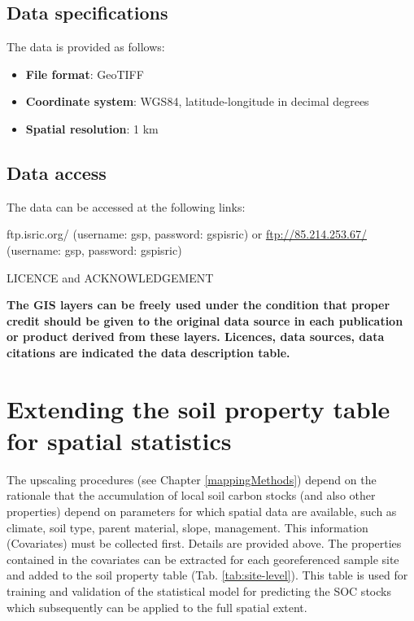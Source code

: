 \documentclass[10pt,b5paper,]{book}
\providecommand{\tightlist}{%
  \setlength{\itemsep}{0pt}\setlength{\parskip}{0pt}}
\theoremstyle{definition}
\theoremstyle{definition}
\theoremstyle{definition}
\theoremstyle{remark}
\begin{document}
\hypertarget{data-specifications}{%
\subsection{Data specifications}\label{data-specifications}}

The data is provided as follows:

\begin{itemize}
\tightlist
\item
  \textbf{File format}: GeoTIFF
\item
  \textbf{Coordinate system}: WGS84, latitude-longitude in decimal
  degrees
\item
  \textbf{Spatial resolution}: 1 km
\end{itemize}

\hypertarget{data-access}{%
\subsection{Data access}\label{data-access}}

The data can be accessed at the following links:

ftp.isric.org/ (username: gsp, password: gspisric) or
\url{ftp://85.214.253.67/} (username: gsp, password: gspisric)

LICENCE and ACKNOWLEDGEMENT

\textbf{The GIS layers can be freely used under the condition that
proper credit should be given to the original data source in each
publication or product derived from these layers. Licences, data
sources, data citations are indicated the data description table.}

\hypertarget{extending-the-soil-property-table-for-spatial-statistics}{%
\section{Extending the soil property table for spatial
statistics}\label{extending-the-soil-property-table-for-spatial-statistics}}

The upscaling procedures (see Chapter \ref{mappingMethods}) depend on
the rationale that the accumulation of local soil carbon stocks (and
also other properties) depend on parameters for which spatial data are
available, such as climate, soil type, parent material, slope,
management. This information (Covariates) must be collected first.
Details are provided above. The properties contained in the covariates
can be extracted for each georeferenced sample site and added to the
soil property table (Tab. \ref{tab:site-level}). This table is used for
training and validation of the statistical model for predicting the SOC
stocks which subsequently can be applied to the full spatial extent.
\end{document}
